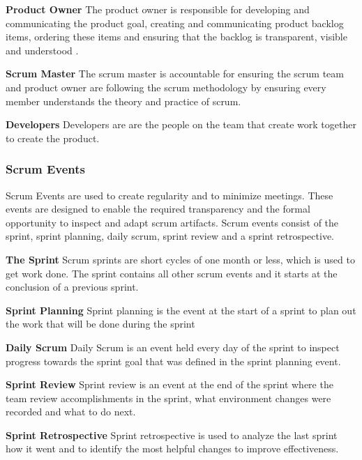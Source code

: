 \textbf{Product Owner}\newline
The product owner is responsible for developing and communicating the product goal, creating and communicating product 
backlog items, ordering these items and ensuring that the backlog is transparent, visible and understood
\cite{scrum_guide}.

\textbf{Scrum Master}\newline
The scrum master is accountable for ensuring the scrum team and product owner are following the scrum methodology by 
ensuring every member understands the theory and practice of scrum\cite{scrum_guide}.

\textbf{Developers}\newline
Developers are are the people on the team that create work together to create the product\cite{what_is_scrum}.

\subsubsection{Scrum Events}
Scrum Events\cite{scrum_guide} are used to create regularity and to minimize meetings. These events are designed to 
enable the required transparency and the formal opportunity to inspect and adapt scrum artifacts. Scrum events 
consist of the sprint, sprint planning, daily scrum, sprint review and a sprint retrospective.

\textbf{The Sprint}\newline
Scrum sprints\cite{what_is_scrum} are short cycles of one month or less, which is used to get work done. The sprint 
contains all other scrum events and it starts at the conclusion of a previous sprint.

\textbf{Sprint Planning}\newline
Sprint planning\cite{what_is_scrum} is the event at the start of a sprint to plan out the work that will be done 
during the sprint

\textbf{Daily Scrum}\newline
Daily Scrum\cite{what_is_scrum} is an event held every day of the sprint to inspect progress towards the sprint goal 
that was defined in the sprint planning event.

\textbf{Sprint Review}\newline
Sprint review\cite{what_is_scrum} is an event at the end of the sprint where the team review accomplishments in the 
sprint, what environment changes were recorded and what to do next.

\textbf{Sprint Retrospective}\newline
Sprint retrospective\cite{what_is_scrum} is used to analyze the last sprint how it went and to identify the most 
helpful changes to improve effectiveness.

